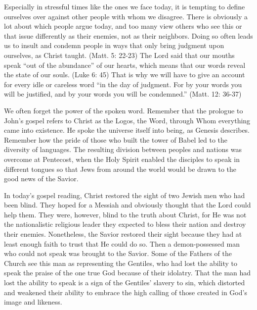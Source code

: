 \documentclass[twoside, letterpaper, 12pt]{report}
\begin{document}
\begin{maybetwocolumns}

Especially in stressful times like the ones we face today, it is tempting to define ourselves over
against other people with whom we disagree. There is obviously a lot about which people argue
today, and too many view others who see this or that issue differently as their enemies, not as
their neighbors. Doing so often leads us to insult and condemn people in ways that only bring
judgment upon ourselves, as Christ taught. (Matt. 5: 22-23) The Lord said that our mouths speak
“out of the abundance” of our hearts, which means that our words reveal the state of our souls.
(Luke 6: 45) That is why we will have to give an account for every idle or careless word “in the
day of judgment. For by your words you will be justified, and by your words you will be condemned.”
(Matt. 12: 36-37)

We often forget the power of the spoken word. Remember that the prologue to John’s gospel refers to
Christ as the Logos, the Word, through Whom everything came into existence. He spoke the universe
itself into being, as Genesis describes. Remember how the pride of those who built the tower of
Babel led to the diversity of languages. The resulting division between peoples and nations was
overcome at Pentecost, when the Holy Spirit enabled the disciples to speak in different tongues so
that Jews from around the world would be drawn to the good news of the Savior.

In today’s gospel reading, Christ restored the sight of two Jewish men who had been blind. They
hoped for a Messiah and obviously thought that the Lord could help them. They were, however, blind
to the truth about Christ, for He was not the nationalistic religious leader they expected to bless
their nation and destroy their enemies. Nonetheless, the Savior restored their sight because they
had at least enough faith to trust that He could do so. Then a demon-possessed man who could not
speak was brought to the Savior. Some of the Fathers of the Church see this man as representing the
Gentiles, who had lost the ability to speak the praise of the one true God because of their
idolatry. That the man had lost the ability to speak is a sign of the Gentiles’ slavery to sin,
which distorted and weakened their ability to embrace the high calling of those created in God’s
image and likeness.


\end{maybetwocolumns}
\end{document}
